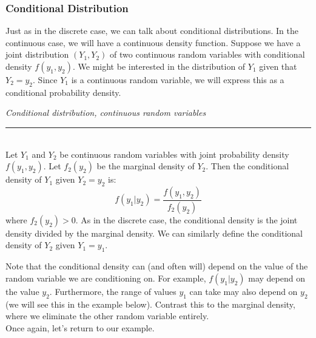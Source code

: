 \documentclass[notes.tex]{subfiles}
\begin{document}
\subsubsection{Conditional Distribution}
Just as in the discrete case, we can talk about conditional distributions. In the continuous case, we will have a continuous density function. Suppose we have a joint distribution $(Y_1, Y_2)$ of two continuous random variables with conditional density $f(y_1, y_2)$. We might be interested in the distribution of $Y_1$ given that $Y_2 = y_2$. Since $Y_1$ is a continuous random variable, we will express this as a conditional probability density.\\

\begin{framed}
\emph{Conditional distribution, continuous random variables}\\
  \rule{\dimexpr{}\fboxrule}{.1pt} \\
Let $Y_1$ and $Y_2$ be continuous random variables with joint probability density $f(y_1, y_2)$. Let $f_2(y_2)$ be the marginal density of $Y_2$. Then the conditional density of $Y_1$ given $Y_2 = y_2$ is:
\[
f(y_1|y_2) = \frac{f(y_1, y_2)}{f_2(y_2)}
\]
where $f_2(y_2) > 0$. As in the discrete case, the conditional density is the joint density divided by the marginal density. We can similarly define the conditional density of $Y_2$ given $Y_1 = y_1$.
\end{framed}
Note that the conditional density can (and often will) depend on the value of the random variable we are conditioning on. For example, $f(y_1|y_2)$ may depend on the value $y_2$. Furthermore, the range of values $y_1$ can take may also depend on $y_2$ (we will see this in the example below). Contrast this to the marginal density, where we eliminate the other random variable entirely.\\

Once again, let's return to our example.
\end{document}
